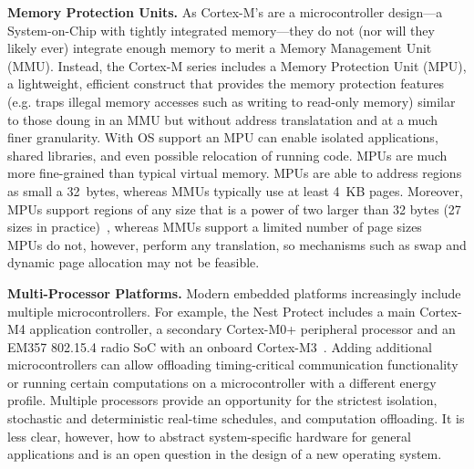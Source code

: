{\bf Memory Protection Units.}
As Cortex-M's are a microcontroller design---a System-on-Chip with tightly
integrated memory---they do not (nor will they likely ever) integrate enough
memory to merit a Memory Management Unit (MMU). Instead, the Cortex-M series
includes a Memory Protection Unit (MPU), a lightweight, efficient construct
that provides the memory protection features (e.g. traps illegal memory
accesses such as writing to read-only memory) similar to those doung in an MMU
but without address translatation and at a much finer granularity.
With OS support an MPU can enable isolated applications, shared libraries, and
even possible relocation of running code.
MPUs are much more fine-grained than typical virtual memory. MPUs are able to
address regions as small a 32~bytes, whereas MMUs typically use at least 4~KB
pages. Moreover, MPUs support regions of any size that is a power of two larger
than 32 bytes (27 sizes in practice)~\cite{cortexm4-ug:ch4.5}, whereas MMUs
support a limited number of page sizes~
MPUs do not, however, perform any translation, so mechanisms such as swap and
dynamic page allocation may not be feasible.

{\bf Multi-Processor Platforms.}
Modern embedded platforms increasingly include multiple microcontrollers.
For example, the Nest
Protect includes a main Cortex-M4 application controller, a secondary
Cortex-M0+ peripheral processor and an EM357 802.15.4 radio SoC with an
onboard Cortex-M3~\cite{nestprotect-teardown}.
Adding additional microcontrollers can allow offloading timing-critical
communication functionality or running certain computations on a microcontroller
with a different energy profile.
Multiple
processors provide an opportunity for
the strictest isolation, stochastic and deterministic real-time schedules, and
computation offloading. It is less clear, however, how to abstract
system-specific hardware for general applications and is an open question in
the design of a new operating system.


